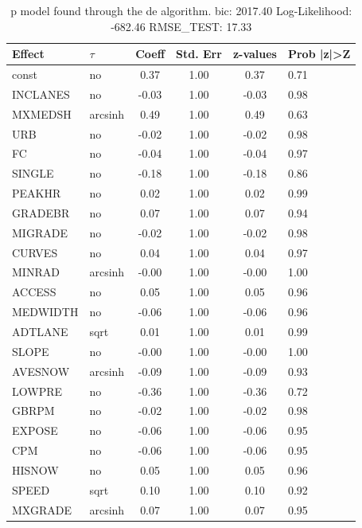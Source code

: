 \begin{table}
	\caption{p model found through the de algorithm. bic: 2017.40 Log-Likelihood: -682.46 RMSE_TEST: 17.33}
	\begin{center}
		\begin{tabular}{|l|l|c|c|c|l|}
			\hline
			Effect & $\tau$ & Coeff & Std. Err & z-values & Prob |z|>Z \\
			\hline
			const & no & 0.37 & 1.00 & 0.37 & 0.71 \\
			\hline
			INCLANES & no & -0.03 & 1.00 & -0.03 & 0.98 \\
			\hline
			MXMEDSH & arcsinh & 0.49 & 1.00 & 0.49 & 0.63 \\
			\hline
			URB & no & -0.02 & 1.00 & -0.02 & 0.98 \\
			\hline
			FC & no & -0.04 & 1.00 & -0.04 & 0.97 \\
			\hline
			SINGLE & no & -0.18 & 1.00 & -0.18 & 0.86 \\
			\hline
			PEAKHR & no & 0.02 & 1.00 & 0.02 & 0.99 \\
			\hline
			GRADEBR & no & 0.07 & 1.00 & 0.07 & 0.94 \\
			\hline
			MIGRADE & no & -0.02 & 1.00 & -0.02 & 0.98 \\
			\hline
			CURVES & no & 0.04 & 1.00 & 0.04 & 0.97 \\
			\hline
			MINRAD & arcsinh & -0.00 & 1.00 & -0.00 & 1.00 \\
			\hline
			ACCESS & no & 0.05 & 1.00 & 0.05 & 0.96 \\
			\hline
			MEDWIDTH & no & -0.06 & 1.00 & -0.06 & 0.96 \\
			\hline
			ADTLANE & sqrt & 0.01 & 1.00 & 0.01 & 0.99 \\
			\hline
			SLOPE & no & -0.00 & 1.00 & -0.00 & 1.00 \\
			\hline
			AVESNOW & arcsinh & -0.09 & 1.00 & -0.09 & 0.93 \\
			\hline
			LOWPRE & no & -0.36 & 1.00 & -0.36 & 0.72 \\
			\hline
			GBRPM & no & -0.02 & 1.00 & -0.02 & 0.98 \\
			\hline
			EXPOSE & no & -0.06 & 1.00 & -0.06 & 0.95 \\
			\hline
			CPM & no & -0.06 & 1.00 & -0.06 & 0.95 \\
			\hline
			HISNOW & no & 0.05 & 1.00 & 0.05 & 0.96 \\
			\hline
			SPEED & sqrt & 0.10 & 1.00 & 0.10 & 0.92 \\
			\hline
			MXGRADE & arcsinh & 0.07 & 1.00 & 0.07 & 0.95 \\

\end{tabular}
\end{center}
\end{table}
